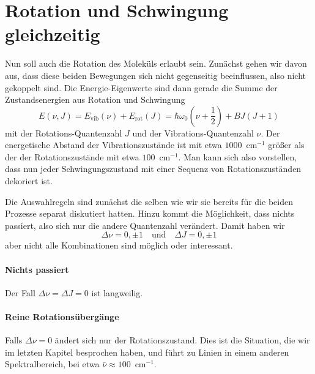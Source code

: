 \section{Rotation und Schwingung gleichzeitig}

Nun soll auch die Rotation des Moleküls erlaubt sein. Zunächst gehen wir davon aus, dass diese beiden Bewegungen sich nicht gegenseitig beeinflussen, also nicht gekoppelt sind. Die Energie-Eigenwerte sind dann gerade die Summe der Zustandsenergien aus Rotation und Schwingung
\begin{equation}
E (\nu, J) = E_\text{vib}(\nu) + E_\text{rot}(J) = \hbar \omega_0 (\nu + \frac{1}{2}) + B J (J+1) \label{eq:vib_rot_simple}
\end{equation}
mit der Rotations-Quantenzahl $J$ und der Vibrations-Quantenzahl $\nu$. Der energetische Abstand der Vibrationszustände ist mit etwa $1000$~cm$^{-1}$  größer als der der Rotationszustände mit etwa $100$~cm$^{-1}$. Man kann sich also vorstellen, dass nun jeder Schwingungszustand mit einer Sequenz von Rotationszuständen dekoriert ist.

Die Auswahlregeln sind zunächst die selben wie wir sie bereits für die beiden Prozesse separat diskutiert hatten. Hinzu kommt die Möglichkeit, dass nichts passiert, also sich nur die andere Quantenzahl verändert. Damit haben wir
\begin{equation}
 \Delta \nu = 0, \pm 1 \quad \text{und} \quad \Delta J = 0, \pm 1 
\end{equation}
aber nicht alle Kombinationen sind möglich oder interessant.

\paragraph{Nichts passiert} Der Fall $\Delta \nu = \Delta J = 0$ ist langweilig.

\paragraph{Reine Rotationsübergänge} Falls $\Delta \nu = 0$ ändert sich nur der Rotationszustand. Dies ist die Situation, die wir im letzten Kapitel besprochen haben, und führt zu Linien  in einem anderen Spektralbereich, bei etwa $\bar{\nu} \approx 100$~cm$^{-1}$.

